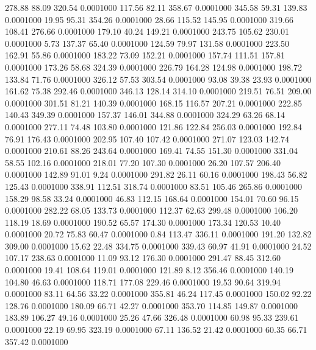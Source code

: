  278.88   88.09  320.54   0.0001000
 117.56   82.11  358.67   0.0001000
 345.58   59.31  139.83   0.0001000
  19.95   95.31  354.26   0.0001000
  28.66  115.52  145.95   0.0001000
 319.66  108.41  276.66   0.0001000
 179.10   40.24  149.21   0.0001000
 243.75  105.62  230.01   0.0001000
   5.73  137.37   65.40   0.0001000
 124.59   79.97  131.58   0.0001000
 223.50  162.91   55.86   0.0001000
 183.22   73.09  152.21   0.0001000
 157.74  111.51  157.81   0.0001000
 173.26   58.68  324.39   0.0001000
 226.79  164.28  124.98   0.0001000
 198.72  133.84   71.76   0.0001000
 326.12   57.53  303.54   0.0001000
  93.08   39.38   23.93   0.0001000
 161.62   75.38  292.46   0.0001000
 346.13  128.14  314.10   0.0001000
 219.51   76.51  209.00   0.0001000
 301.51   81.21  140.39   0.0001000
 168.15  116.57  207.21   0.0001000
 222.85  140.43  349.39   0.0001000
 157.37  146.01  344.88   0.0001000
 324.29   63.26   68.14   0.0001000
 277.11   74.48  103.80   0.0001000
 121.86  122.84  256.03   0.0001000
 192.84   76.91  176.43   0.0001000
 202.95  107.40  107.42   0.0001000
 271.07  123.03  142.74   0.0001000
 210.61   88.26  243.64   0.0001000
 169.41   74.55  151.30   0.0001000
 331.04   58.55  102.16   0.0001000
 218.01   77.20  107.30   0.0001000
  26.20  107.57  206.40   0.0001000
 142.89   91.01    9.24   0.0001000
 291.82   26.11   60.16   0.0001000
 198.43   56.82  125.43   0.0001000
 338.91  112.51  318.74   0.0001000
  83.51  105.46  265.86   0.0001000
 158.29   98.58   33.24   0.0001000
  46.83  112.15  168.64   0.0001000
 154.01   70.60   96.15   0.0001000
 282.22   68.05  133.73   0.0001000
 112.37   62.63  299.48   0.0001000
 106.20  118.19   18.69   0.0001000
 190.52   65.57  174.30   0.0001000
 173.34  120.53   10.40   0.0001000
  20.72   75.83   60.47   0.0001000
   0.84  113.47  336.11   0.0001000
 191.20  132.82  309.00   0.0001000
  15.62   22.48  334.75   0.0001000
 339.43   60.97   41.91   0.0001000
  24.52  107.17  238.63   0.0001000
  11.09   93.12  176.30   0.0001000
 291.47   88.45  312.60   0.0001000
  19.41  108.64  119.01   0.0001000
 121.89    8.12  356.46   0.0001000
 140.19  104.80   46.63   0.0001000
 118.71  177.08  229.46   0.0001000
  19.53   90.64  319.94   0.0001000
  83.11   64.56   33.22   0.0001000
 355.81   46.24  117.45   0.0001000
 150.02   92.22  128.76   0.0001000
 180.09   66.71   42.27   0.0001000
 353.70  114.85  149.87   0.0001000
 183.89  106.27   49.16   0.0001000
  25.26   47.66  326.48   0.0001000
  60.98   95.33  239.61   0.0001000
  22.19   69.95  323.19   0.0001000
  67.11  136.52   21.42   0.0001000
  60.35   66.71  357.42   0.0001000
